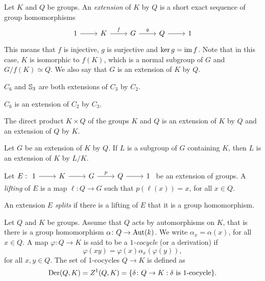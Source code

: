 \chapter{}


Let $K$ and $Q$ be groups.
An {\em extension} of $K$ by $Q$ is a
short exact sequence of group homomorphisms 
\[
\begin{tikzcd}
	1 & K & G & Q & 1
	\arrow[from=1-1, to=1-2]
	\arrow["f", from=1-2, to=1-3]
	\arrow["g", from=1-3, to=1-4]
	\arrow[from=1-4, to=1-5]
\end{tikzcd}
\]
This means that $f$ is injective, $g$ is surjective and $\ker g=\operatorname{im} f$. Note that in this case, $K$ is isomorphic to $f(K)$, which is a normal subgroup of $G$ and $G/f(K)\simeq Q$. We also say that $G$ is an extension of $K$ by $Q$.

\begin{example}
	$C_6$ and $\mathbb{S}_3$ are both extensions of $C_3$ by $C_2$.
\end{example}

\begin{example}
	$C_6$ is an extension of $C_2$ by $C_3$.
\end{example}

\begin{example}
    The direct product $K\times Q$ of the groups $K$ and $Q$ 
    is an extension of $K$ by $Q$ and an extension of $Q$ by $K$. 
\end{example}

\begin{example}
Let $G$ be an extension of $K$ by $Q$. If $L$ is a subgroup of $G$ containing $K$, 
then $L$ is an extension
of $K$ by $L/K$.
\end{example}

Let $E:
\begin{tikzcd}
	1 & K & G & Q & 1
	\arrow[from=1-1, to=1-2]
	\arrow[from=1-2, to=1-3]
	\arrow["p", from=1-3, to=1-4]
	\arrow[from=1-4, to=1-5]
\end{tikzcd}$
be an extension of groups. A {\em lifting} of $E$ is a map $\ell\colon
Q\to G$ such that $p(\ell(x))=x$, for all $x\in Q$. 

An extension $E$ {\em splits} if there is a lifting of $E$ that it is a group
homomorphism. 

Let $Q$ and $K$ be groups. Assume that $Q$ acts by automorphisms on $K$, that is there is a group homomorphism $\alpha\colon Q\rightarrow \operatorname{Aut}(k)$. We write $\alpha_x=\alpha(x)$, for all $x\in Q$.
A map $\varphi\colon Q\to K$ is said to be a {\em $1$-cocycle} (or a derivation) if
\[
		\varphi(xy)=\varphi(x)\alpha_x(\varphi(y)),
\]
for all $x,y\in Q$.  The set of 1-cocycles $Q\to K$ is defined as 
\[
\operatorname{Der}(Q,K)=Z^1(Q,K)=\{\delta\colon Q\to K:\text{$\delta$ is $1$-cocycle}\}.
\]

